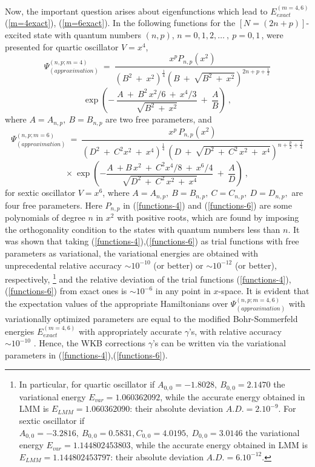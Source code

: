 \documentclass[preprint,preprintnumbers,amsmath,amssymb]{revtex4}
\begin{document}
Now, the important question arises about eigenfunctions which lead to $E^{(m=4,6)}_{exact}$ (\ref{m=4exact}), (\ref{m=6exact}). In \cite{AHO} the following functions for the $[N=(2n+p)]$-excited state with quantum numbers $(n,p)$, $n=0,1,2,\ldots\ ,\ p=0,1$\,, were presented for quartic oscillator $V=x^4$,
\[
 \Psi^{(n,p;m=4)}_{(approximation)}\ =\
 \frac{x^p P_{n,p}(x^2)}{\left(B^2\ +\ x^2 \right)^{\frac{1}{4}}
 \left({B}\ +\ \sqrt{B^2\ +\ x^2} \right)^{2n+p+\frac{1}{2}}}
\]
\begin{equation}
\label{functions-4}
   \exp \left(-\ \dfrac{A\ +\ B^2\,x^2/6\ +\ x^4/3}
  {\sqrt{B^2\ +\ x^2}} \ +\ \frac{A}{B}\right)\ ,
\end{equation}
where $A=A_{n,p},\ B=B_{n,p}$ are two free parameters, and
\[
\Psi^{(n,p;m=6)}_{(approximation)}\ =\
\frac{x^p\,P_{n,p}(x^2)}
{(D^2\ +\ C^2 x^2\ +\ x^4 )^{\frac{1}{4}}\,
(D\ +\ \sqrt{D^2\ +\ C^2\,x^2\ +\ x^4 })^{n+\frac{p}{2}+\frac{1}{4}}
}
\]
\begin{equation}
\label{functions-6}
\times\ {\exp \left(-\dfrac{A\ +B\,x^2\ +\ C^2x^4/8\ +\ x^6/4}{\sqrt{D^2\ +\ C^2\,x^2\ +\ x^4 }}\ +\ \dfrac{A}{D}\right)} \ ,
\end{equation}
for sextic oscillator $V=x^6$, where $A=A_{n,p},\ B=B_{n,p}, \ C=C_{n,p},\ D=D_{n,p},$ are four free parameters. Here $P_{n,p}$ in (\ref{functions-4}) and (\ref{functions-6}) are some polynomials of degree $n$ in $x^2$ with positive roots, which are found by imposing the orthogonality condition to the states with quantum numbers less than $n$.
It was shown that taking (\ref{functions-4}),(\ref{functions-6}) as trial functions with free parameters as variational, the variational energies are obtained with unprecedental relative accuracy $\sim 10^{-10}$ (or better) or $\sim 10^{-12}$ (or better), respectively, 
\footnote{In particular, for quartic oscillator if $A_{0,0}=-1.8028,\ B_{0,0}=2.1470$ the variational energy $E_{var}=1.060 362 092$, while the accurate energy obtained in LMM is $E_{LMM}=1.060 362 090$: their absolute deviation $A.D.=2. 10^{-9}$. For sextic oscillator if $A_{0,0}=-3.2816,\ B_{0,0}=0.5831, C_{0,0}=4.0195,\ D_{0,0}=3.0146$ the variational energy $E_{var}=1.144 802 453 803$, while the accurate energy obtained in LMM is $E_{LMM}=1.144 802 453 797$: their absolute deviation $A.D.=6. 10^{-12}$.}
and the relative deviation of the trial functions (\ref{functions-4}),(\ref{functions-6}) from exact ones is $\sim 10^{-6}$ in any point in $x$-space. It is evident that the expectation values of the appropriate Hamiltonians over $\Psi^{(n,p;m=4,6)}_{(approximation)}$ with variationally optimized parameters are equal to the modified Bohr-Sommerfeld energies $E^{(m=4,6)}_{exact}$ with appropriately accurate $\gamma$'s, with relative accuracy $\sim 10^{-10}$ . Hence, the WKB corrections $\gamma$'s can be written via the variational parameters in (\ref{functions-4}),(\ref{functions-6}).
\end{document}
